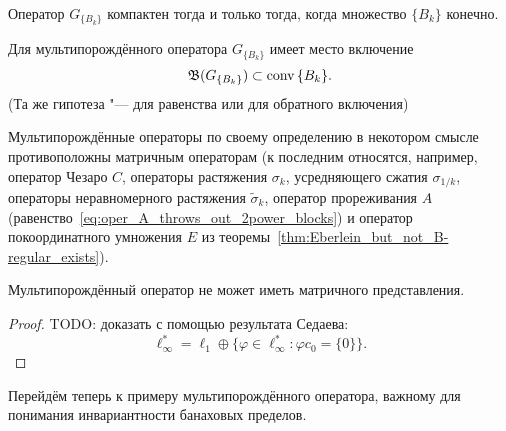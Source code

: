 \begin{hypothesis}
	Оператор $G_{\{B_k\}}$ компактен тогда и только тогда, когда множество ${\{B_k\}}$ конечно.
\end{hypothesis}

\begin{hypothesis}
	Для мультипорождённого оператора $G_{\{B_k\}}$ имеет место включение
	\begin{equation}
		\mathfrak{B} (G_{\{B_k\}}) \subset \operatorname{conv} {\{B_k\}}
		.
	\end{equation}
	(Та же гипотеза "--- для равенства или для обратного включения)
\end{hypothesis}

\begin{remark}
	Мультипорождённые операторы по своему определению в некотором смысле противоположны матричным операторам
	(к последним относятся, например, оператор Чезаро $C$, операторы растяжения $\sigma_k$, усредняющего сжатия $\sigma_{1/k}$,
	операторы неравномерного растяжения $\tilde\sigma_k$, оператор прореживания $A$ (равенство~\eqref{eq:oper_A_throws_out_2power_blocks}) и оператор покоординатного умножения $E$ из теоремы~\ref{thm:Eberlein_but_not_B-regular_exists}).
\end{remark}

\begin{theorem}
	Мультипорождённый оператор не может иметь матричного представления.
\end{theorem}

\begin{proof}
	TODO: доказать с помощью результата Седаева:
	\begin{equation}
		\ell_\infty^* = \ell_1 \oplus \{\varphi \in\ell_\infty^* : \varphi c_0 = \{0\}\}
		.
	\end{equation}
\end{proof}

Перейдём теперь к примеру мультипорождённого оператора, важному для понимания инвариантности банаховых пределов.

